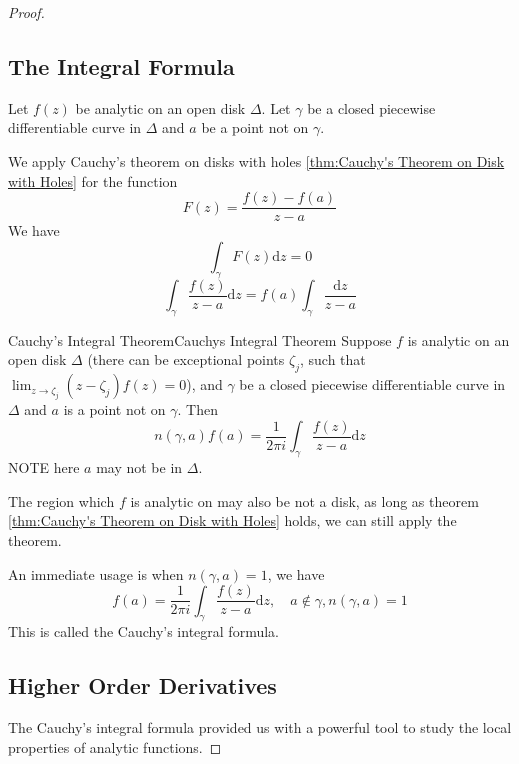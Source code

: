 \documentclass[../main.tex]{subfiles}
\begin{document}
\begin{proof}
\subsection{The Integral Formula}

Let $f(z)$ be analytic on an open disk $\Delta$. Let $\gamma$ be a closed piecewise differentiable curve in $\Delta$ and $a$ be a point not on $\gamma$.

We apply Cauchy's theorem on disks with holes \ref{thm:Cauchy's Theorem on Disk with Holes} for the function
\begin{equation}
F(z) = \frac{f(z)-f(a)}{z-a}
\end{equation}
We have
\begin{equation}
	\int_{\gamma} F(z) \mathrm{d} z = 0
\end{equation}
\begin{equation}
	\int_{\gamma} \frac{f(z)}{z-a} \mathrm{d} z = f(a) \int_{\gamma} \frac{\mathrm{d} z}{z-a}
\end{equation}

\begin{theorem}{Cauchy's Integral Theorem}{Cauchys Integral Theorem}
Suppose $f$ is analytic on an open disk $\Delta$ (there can be exceptional points $\zeta_j$, such that $\lim_{z \to \zeta_j} (z-\zeta_j)f(z) =0$), and $\gamma$ be a closed piecewise differentiable curve in $\Delta$ and $a$ is a point not on $\gamma$. Then
\begin{equation}
	n(\gamma,a) f(a) = \frac{1}{2\pi i} \int_{\gamma} \frac{f(z)}{z-a} \mathrm{d} z
\end{equation}
NOTE here $a$ may not be in $\Delta$.
\end{theorem}

\begin{remark}
	The region which $f$ is analytic on may also be not a disk, as long as theorem \ref{thm:Cauchy's Theorem on Disk with Holes} holds, we can still apply the theorem.
\end{remark}

An immediate usage is when $n(\gamma,a)=1$, we have
\begin{equation}
	f(a) = \frac{1}{2\pi i} \int_{\gamma} \frac{f(z)}{z-a} \mathrm{d} z, \quad a\notin \gamma, n(\gamma,a)=1
\end{equation}
This is called the Cauchy's integral formula.

\subsection{Higher Order Derivatives}
The Cauchy's integral formula provided us with a powerful tool to study the local properties of analytic functions.


\end{proof}
\end{document}
